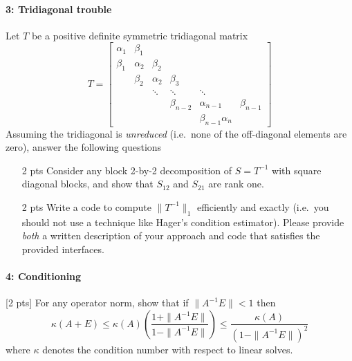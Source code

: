 \documentclass[12pt, leqno]{article} %
\begin{document}
\paragraph*{3: Tridiagonal trouble}
Let $T$ be a positive definite symmetric tridiagonal matrix
\[
T = \begin{bmatrix}
  \alpha_1 & \beta_1 \\
  \beta_1 & \alpha_2 & \beta_2 \\
  & \beta_2 & \alpha_2 & \beta_3 \\
  & & \ddots & \ddots & \ddots \\
  & & & \beta_{n-2} & \alpha_{n-1} &\beta_{n-1} \\
  & & & & \beta_{n-1} \alpha_n
  \end{bmatrix}
\]
Assuming the tridiagonal is {\em unreduced} (i.e.~none of the
off-diagonal elements are zero), answer the following questions
\begin{itemize}
\item[2 pts] Consider any block 2-by-2 decomposition of $S = T^{-1}$ with
  square diagonal blocks, and show that $S_{12}$ and $S_{21}$ are rank
  one.
\item[2 pts] Write a code to compute $\|T^{-1}\|_1$ efficiently and exactly
  (i.e.~you should not use a technique like Hager's condition estimator).
  Please provide {\em both} a written description of your approach and
  code that satisfies the provided interfaces.
\end{itemize}

\paragraph*{4: Conditioning}
[2 pts] For any operator norm, show that if $\|A^{-1} E\| < 1$ then
\[
  \kappa(A+E)
  \leq \kappa(A) \left( \frac{1+\|A^{-1} E\|}{1-\|A^{-1}E\|} \right)
  \leq \frac{\kappa(A)}{(1-\|A^{-1}E\|)^2}
\]
where $\kappa$ denotes the condition number with respect to linear solves.
\end{document}
